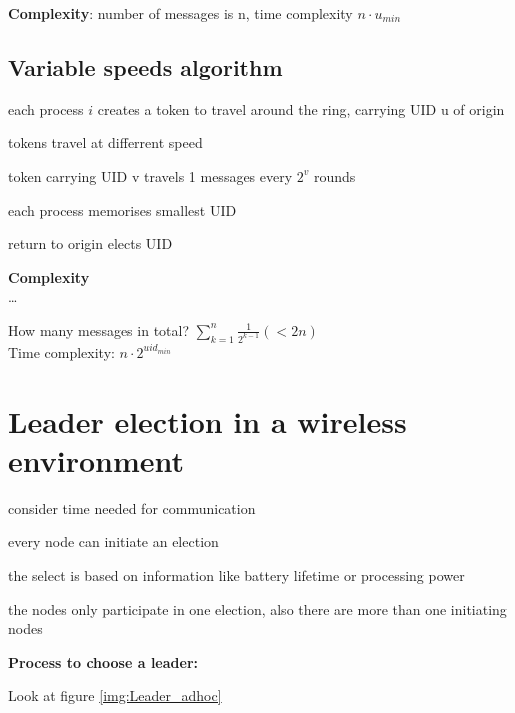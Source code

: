 \textbf{Complexity}: number of messages is n, time complexity $n\cdot u_{min}$

\subsection{Variable speeds algorithm}
\begin{compactitem}
\item each process $i$ creates a token to travel around the ring, carrying UID u of origin
\item tokens travel at differrent speed
\item token carrying UID v travels  1 messages every $2^{v}$ rounds
\item each process memorises smallest UID
\item return to origin elects UID
\end{compactitem}

\textbf{Complexity}\\
\dots


How many messages in total? $\sum\limits_{k=1}^n \frac{1}{2^{k-1}} (<2n)$\\
Time complexity: $n\cdot 2^{{uid}_{min}}$

\section{Leader election in a wireless environment}
\begin{compactitem}
\item consider time needed for communication
\item every node can initiate an election
\item the select is based on information like battery lifetime or processing power
\item the nodes only participate in one election, also there are more than one initiating nodes
\end{compactitem}

\textbf{Process to choose a leader:}

Look at figure \ref{img:Leader_adhoc}


